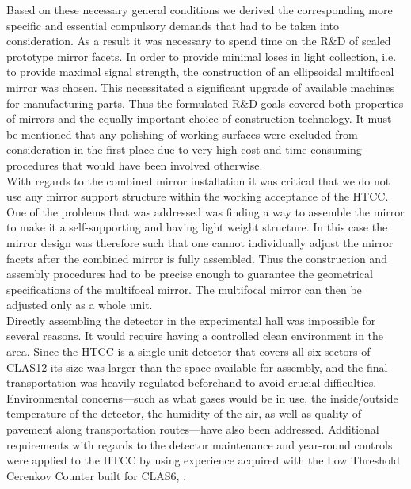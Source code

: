 Based on these necessary general conditions we derived the corresponding more specific and essential compulsory demands that had to be taken into consideration. As a result it was necessary to spend time on the R$\&$D of scaled prototype mirror facets. In order to provide minimal loses in light collection, i.e. to provide maximal signal strength, the construction of an ellipsoidal multifocal mirror was chosen. This necessitated a significant upgrade of available machines for manufacturing parts. Thus the formulated R$\&$D goals covered both properties of mirrors and the equally important choice of construction technology. It must be mentioned that any polishing of working surfaces were excluded from consideration in the first place due to very high cost and time consuming procedures that would have been involved otherwise. \\
\indent With regards to the combined mirror installation it was critical that we do not use any mirror support structure within the working acceptance of the HTCC. One of the problems that was addressed was finding a way to assemble the mirror to make it a self-supporting and having light weight structure. In this case the mirror design was therefore such that one cannot individually adjust the mirror facets after the combined mirror is fully assembled. Thus the construction and assembly procedures had to be precise enough to guarantee the geometrical specifications of the multifocal mirror. The multifocal mirror can then be adjusted only as a whole unit. \\
\indent Directly assembling the detector in the experimental hall was impossible for several reasons. It would require having a controlled clean environment in the area. Since the HTCC is a single unit detector that covers all six sectors of CLAS12 its size was larger than the space available for assembly, and the final transportation was heavily regulated beforehand to avoid crucial difficulties. Environmental concerns---such as what gases would be in use, the inside/outside temperature of the detector, the humidity of the air, as well as quality of pavement along transportation routes---have also been addressed. Additional requirements with regards to the detector maintenance and year-round controls were applied to the HTCC by using experience acquired with the Low Threshold Cerenkov Counter built for CLAS6, \cite{second}.

